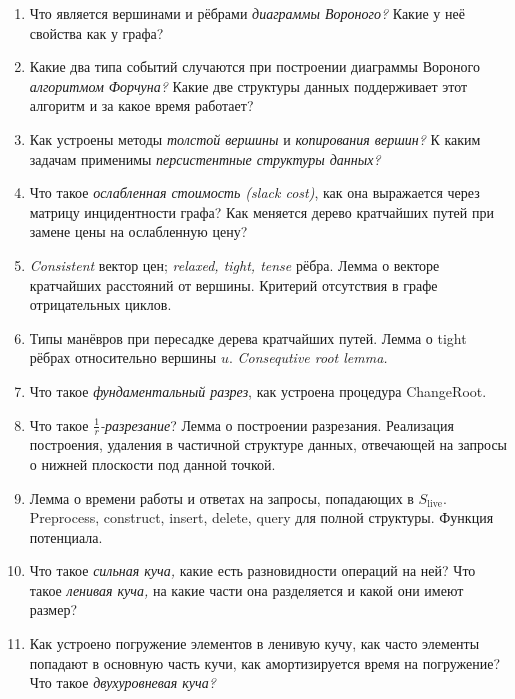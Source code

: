 \documentclass[a4paper,10pt]{article}
\begin{document}
\begin{enumerate}[leftmargin=*,itemsep=-0.1mm]
\item Что является вершинами и рёбрами {\sl диаграммы Вороного?} Какие у неё свойства как у графа?

\item Какие два типа событий случаются при построении диаграммы Вороного {\sl алгоритмом Форчуна?} Какие две структуры данных поддерживает этот алгоритм и за какое время работает?

\item Как устроены методы {\sl толстой вершины} и {\sl копирования вершин?} К каким задачам применимы {\sl персистентные структуры данных?}

\item Что такое {\sl ослабленная стоимость (slack cost)}, как она выражается через матрицу инцидентности графа? Как меняется дерево кратчайших путей при замене цены на ослабленную цену?

\item {\sl Consistent} вектор цен; {\sl relaxed, tight, tense} рёбра. Лемма о векторе кратчайших расстояний от вершины. Критерий отсутствия в графе отрицательных циклов.

\item Типы манёвров при пересадке дерева кратчайших путей. Лемма о tight рёбрах относительно вершины \(u\). {\sl Consequtive root lemma.}

\item Что такое {\sl фундаментальный разрез}, как устроена процедура ChangeRoot.

\item Что такое {\sl \(\frac 1 r\)-разрезание}? Лемма о построении разрезания.
Реализация построения, удаления в частичной структуре данных, отвечающей на запросы о нижней плоскости под данной точкой.

\item Лемма о времени работы и ответах на запросы, попадающих в \(S_\text{live}\).
Preprocess, construct, insert, delete, query для полной структуры. Функция потенциала.

\item Что такое {\sl сильная куча,} какие есть разновидности операций на ней? Что такое {\sl ленивая куча,} на какие части она разделяется и какой они имеют размер?

\item Как устроено погружение элементов в ленивую кучу, как часто элементы попадают в основную часть кучи, как амортизируется время на погружение? Что такое {\sl двухуровневая куча?}


\end{enumerate}
\end{document}
